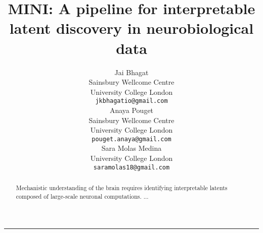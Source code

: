 \documentclass{article}
\title{
  MINI: A pipeline for interpretable latent discovery in neurobiological data
}
\author{
  Jai Bhagat \\
  Sainsbury Wellcome Centre \\
  University College London \\
  \texttt{jkbhagatio@gmail.com} \\
  \And
  Anaya Pouget \\
  Sainsbury Wellcome Centre \\
  University College London \\
  \texttt{pouget.anaya@gmail.com} \\
  \And
  Sara Molas Medina \\
  University College London \\
  \texttt{saramolas18@gmail.com} \\
}
\begin{document}
\maketitle

\begin{abstract}
Mechanistic understanding of the brain requires identifying interpretable latents composed 
of large-scale neuronal computations. ...
\end{abstract}






\vspace{2em} \hrule  
\newpage

\nocite{lenail_2019_nnsvg}






\end{document}
